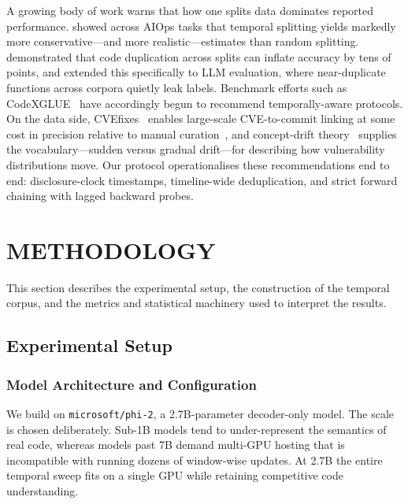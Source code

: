 \documentclass[a4paper,twoside]{article}
\begin{document}
\noindent A growing body of work warns that how one splits data dominates reported performance. \citet{Lyu2022Splitting} showed across AIOps tasks that temporal splitting yields markedly more conservative---and more realistic---estimates than random splitting. \citet{Allamanis2019Duplication} demonstrated that code duplication across splits can inflate accuracy by tens of points, and \citet{Fischer2025DupLeak} extended this specifically to LLM evaluation, where near-duplicate functions across corpora quietly leak labels. Benchmark efforts such as CodeXGLUE~\citep{Lu2021CodeXGLUE} have accordingly begun to recommend temporally-aware protocols. On the data side, CVEfixes~\citep{Bhandari2021CVEfixes} enables large-scale CVE-to-commit linking at some cost in precision relative to manual curation~\citep{Ponta2019Dataset}, and concept-drift theory~\citep{Hinder2024ConceptDrift} supplies the vocabulary---sudden versus gradual drift---for describing how vulnerability distributions move. Our protocol operationalises these recommendations end to end: disclosure-clock timestamps, timeline-wide deduplication, and strict forward chaining with lagged backward probes.

\section{\uppercase{Methodology}}
\label{sec:method}

This section describes the experimental setup, the construction of the temporal corpus, and the metrics and statistical machinery used to interpret the results.

\subsection{Experimental Setup}
\label{sec:setup}

\subsubsection{Model Architecture and Configuration}
\label{sec:model-config}

\noindent
We build on \texttt{microsoft/phi-2}, a 2.7B-parameter decoder-only model. The scale is chosen deliberately. Sub-1B models tend to under-represent the semantics of real code, whereas models past 7B demand multi-GPU hosting that is incompatible with running dozens of window-wise updates. At 2.7B the entire temporal sweep fits on a single GPU while retaining competitive code understanding.
\end{document}
